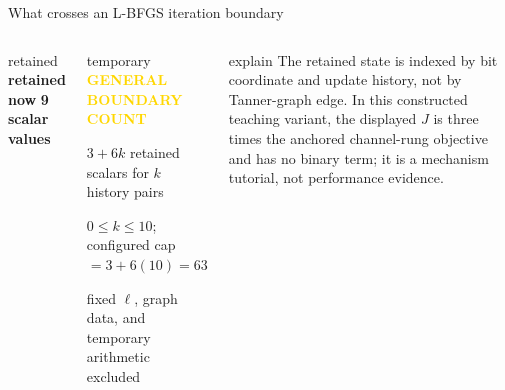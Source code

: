 \documentclass[aspectratio=169,9pt,t]{beamer}
\newcommand{\callout}[1]{%
  \begin{beamercolorbox}[rounded=true,sep=.65ex]{explain}
    \scriptsize #1
  \end{beamercolorbox}}
\begin{document}
\begin{frame}{What crosses an L-BFGS iteration boundary}
\begin{columns}[T,onlytextwidth]
\begin{beamercolorbox}[rounded=true,sep=.8ex]{retained}
        \textbf{retained now} \hfill \textbf{9 scalar values}
      \end{beamercolorbox}
      \vspace{1mm}
      \begin{beamercolorbox}[rounded=true,sep=.8ex]{temporary}
        \scriptsize\textcolor{Gold}{\bfseries GENERAL BOUNDARY COUNT}\par\vspace{.5mm}
        \fontsize{7.2}{8.3}\selectfont
        $3+6k$ retained scalars for $k$ history pairs\par
        $0\le k\le10$; configured cap $=3+6(10)=63$\par
        fixed $\boldsymbol\ell$, graph data, and temporary arithmetic excluded
      \end{beamercolorbox}
      \vspace{1mm}
      \callout{\centering The retained state is indexed by bit coordinate and update history, not by Tanner-graph edge. In this constructed teaching variant, the displayed $J$ is three times the anchored channel-rung objective and has no binary term; it is a mechanism tutorial, not performance evidence.}
  \end{columns}
\end{frame}
\end{document}
